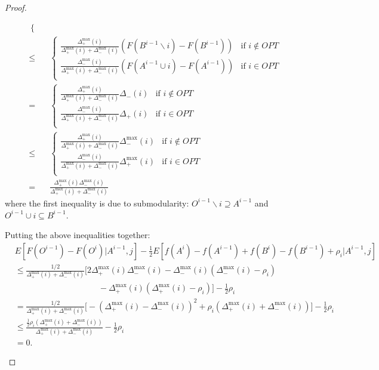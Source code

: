 \documentclass{article} %
\begin{document}
\begin{proof}
\begin{description}
\begin{align*}
\begin{cases}
\end{cases}\\
\leq&\begin{cases}
    \frac{\Delta_+^{\max}(i)}{\Delta_+^{\max}(i) + \Delta_-^{\max}(i)} (F(B^{i-1}\backslash i) - F(B^{i-1})) & \text{if $i\not\in OPT$}\\
    \frac{\Delta_-^{\max}(i)}{\Delta_+^{\max}(i) + \Delta_-^{\max}(i)} (F(A^{i-1}\cup i) - F(A^{i-1}))       & \text{if $i    \in OPT$}\\
\end{cases}\\
=&\begin{cases}
    \frac{\Delta_+^{\max}(i)}{\Delta_+^{\max}(i) + \Delta_-^{\max}(i)} \Delta_-(i) & \text{if $i\not\in OPT$}\\
    \frac{\Delta_-^{\max}(i)}{\Delta_+^{\max}(i) + \Delta_-^{\max}(i)} \Delta_+(i) & \text{if $i    \in OPT$}\\
\end{cases}\\
\leq&\begin{cases}
    \frac{\Delta_+^{\max}(i)}{\Delta_+^{\max}(i) + \Delta_-^{\max}(i)} \Delta_-^{\max}(i) & \text{if $i\not\in OPT$}\\
    \frac{\Delta_-^{\max}(i)}{\Delta_+^{\max}(i) + \Delta_-^{\max}(i)} \Delta_+^{\max}(i) & \text{if $i    \in OPT$}\\
\end{cases}\\
=& \frac{\Delta_+^{\max}(i)\Delta_-^{\max}(i)}{\Delta_+^{\max}(i) + \Delta_-^{\max}(i)}
\end{align*}
where the first inequality is due to submodularity: $O^{i-1}\backslash i \supseteq A^{i-1}$ and $O^{i-1}\cup i \subseteq B^{i-1}$.

Putting the above inequalities together:
\begin{align*}
&E[F(O^{i-1}) - F(O^i) | A^{i-1}, j] - \frac{1}{2} E[f(A^i) - f(A^{i-1}) + f(B^i) - f(B^{i-1}) + \rho_i  | A^{i-1}, j]\\
&\leq \frac{1/2}{\Delta_+^{\max}(i) + \Delta_-^{\max}(i)}\bigg[
2\Delta_+^{\max}(i)\Delta_-^{\max}(i)
- \Delta_-^{\max}(i)(\Delta_-^{\max}(i) - \rho_i)\\
&\quad\quad\quad\quad\quad\quad\quad\quad\quad\quad- \Delta_+^{\max}(i)(\Delta_+^{\max}(i) - \rho_i)
\bigg]- \frac{1}{2}\rho_i\\
&= \frac{1/2}{\Delta_+^{\max}(i) + \Delta_-^{\max}(i)}\bigg[-(\Delta_+^{\max}(i) - \Delta_-^{\max}(i))^2 + \rho_i(\Delta_+^{\max}(i) + \Delta_-^{\max}(i))\bigg] - \frac{1}{2}\rho_i\\
&\leq \frac{\frac{1}{2}\rho_i(\Delta_+^{\max}(i) + \Delta_-^{\max}(i))}{\Delta_+^{\max}(i) + \Delta_-^{\max}(i)} - \frac{1}{2}\rho_i\\
&= 0.
\end{align*}


\end{description}
\end{proof}
\end{document}
